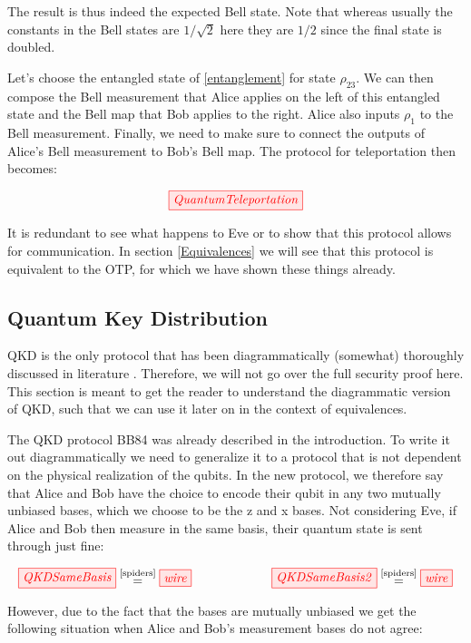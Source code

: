 \documentclass[]{article}
\newcommand{\equaltext}[1]{\ensuremath{\stackrel{\text{#1}}{=}}}
\begin{document}
The result is thus indeed the expected Bell state. Note that whereas usually the constants in the Bell states are $1/\sqrt{2}$ here they are $1/2$ since the final state is doubled.

Let's choose the entangled state of \ref{entanglement} for state $\rho_{23}$. We can then compose the Bell measurement that Alice applies on the left of this entangled state and the Bell map that Bob applies to the right. Alice also inputs $\rho_1$ to the Bell measurement. Finally, we need to make sure to connect the outputs of Alice's Bell measurement to Bob's Bell map. The protocol for teleportation then becomes: 
 
\begin{equation}
	\tikzfig{QuantumTeleportation}
\end{equation}
 
It is redundant to see what happens to Eve or to show that this protocol allows for communication. In section \ref{Equivalences} we will see that this protocol is equivalent to the OTP, for which we have shown these things already. 
 
\subsection{Quantum Key Distribution}

QKD is the only protocol that has been diagrammatically (somewhat) thoroughly discussed in literature \cite{Kissinger2017}. Therefore, we will not go over the full security proof here. This section is meant to get the reader to understand the diagrammatic version of QKD, such that we can use it later on in the context of equivalences.

The QKD protocol BB84 was already described in the introduction. To write it out diagrammatically we need to generalize it to a protocol that is not dependent on the physical realization of the qubits. In the new protocol, we therefore say that Alice and Bob have the choice to encode their qubit in any two mutually unbiased bases, which we choose to be the z and x bases. Not considering Eve, if Alice and Bob then measure in the same basis, their quantum state is sent through just fine:

\begin{equation}
	\tikzfig{QKDSameBasis} \equaltext{\ref{spiders}} \tikzfig{wire} ~~~~~~~~~~~~~~~~~~~ \tikzfig{QKDSameBasis2} \equaltext{\ref{spiders}} \tikzfig{wire}
\end{equation}

However, due to the fact that the bases are mutually unbiased we get the following situation when Alice and Bob's measurement bases do not agree:
\end{document}
